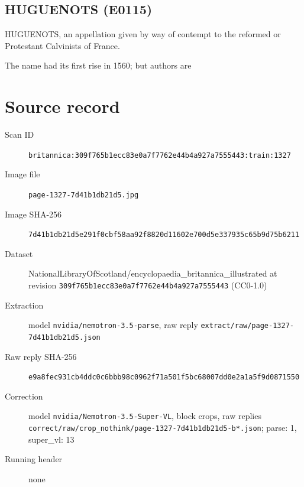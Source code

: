 \documentclass{article}
\begin{document}
\subsection*{HUGUENOTS (E0115)}
HUGUENOTS, an appellation given by way of
contempt to the reformed or Protestant Calvinists of
France.

The name had its first rise in 1560; but authors are


\section*{Source record}
\begin{description}
\item[Scan ID] \texttt{britannica:309f765b1ecc83e0a7f7762e44b4a927a7555443:train:1327}
\item[Image file] \texttt{page-1327-7d41b1db21d5.jpg}
\item[Image SHA-256] \texttt{7d41b1db21d5e291f0cbf58aa92f8820d11602e700d5e337935c65b9d75b6211}
\item[Dataset] NationalLibraryOfScotland/encyclopaedia\_britannica\_illustrated at revision \texttt{309f765b1ecc83e0a7f7762e44b4a927a7555443} (CC0-1.0)
\item[Extraction] model \texttt{nvidia/nemotron-3.5-parse}, raw reply \texttt{extract/raw/page-1327-7d41b1db21d5.json}
\item[Raw reply SHA-256] \texttt{e9a8fec931cb4ddc0c6bbb98c0962f71a501f5bc68007dd0e2a1a5f9d0871550}
\item[Correction] model \texttt{nvidia/Nemotron-3.5-Super-VL}, block crops, raw replies \texttt{correct/raw/crop\_nothink/page-1327-7d41b1db21d5-b*.json}; parse: 1, super\_vl: 13
\item[Running header] none
\end{description}
\end{document}
